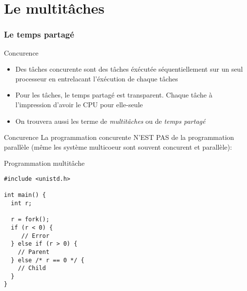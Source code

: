 %                                                                                                               
%
%

\part{Le multitâches}

\section{Le temps partagé}

\begin{frame}{Concurence}
  \begin{itemize}
  \item   Des    tâches   concurente   sont    des   tâches   éxécutée
    séquentiellement sur un seul processeur en entrelacant l'éxécution
    de chaque tâches
  \item  Pour les tâches,  le temps  partagé est  transparent.  Chaque
    tâche à l'impression d'avoir le CPU pour elle-seule
  \item  On  trouvera aussi  les  terme  de  \emph{multitâches} ou  de
    \emph{temps partagé}
  \end{itemize}
\end{frame} 

\begin{frame}{Concurence}
   La programmation concurente N'EST  PAS de la programmation parallèle
  (même les système multicoeur sont souvent concurent et parallèle):
  \begin{center}
  \end{center}
\end{frame}

\begin{frame}[fragile]{Programmation multitâche}
\begin{lstlisting}
#include <unistd.h>

int main() {
  int r;

  r = fork();
  if (r < 0) {
     // Error
  } else if (r > 0) {
    // Parent
  } else /* r == 0 */ {
    // Child
  }
}
\end{lstlisting} 
\end{frame} 


